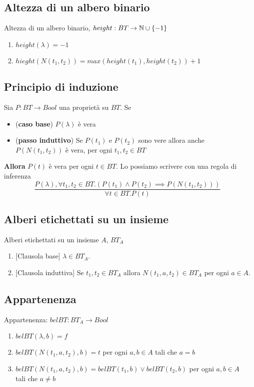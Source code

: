 \documentclass{article}
\begin{document}
\subsection*{Altezza di un albero binario}
Altezza di un albero binario, \(height: BT \rightarrow \mathbb{N} \cup \{-1\}\)
\begin{enumerate}
    \item \(height(\lambda) = -1\)
    \item \(hieght(N(t_1,t_2)) = max(height(t_1), height(t_2)) + 1\)
\end{enumerate}
\subsection*{Principio di induzione}
Sia \(P: BT \rightarrow Bool\) una proprietà su \(BT\). Se
\begin{itemize}
    \item (\textbf{caso base}) \(P(\lambda)\) è vera
    \item (\textbf{passo induttivo}) Se \(P(t_1)\) e \(P(t_2)\) sono vere allora anche \(P(N(t_1,t_2))\) è vera, per ogni \(t_1, t_2 \in BT\)
\end{itemize}
\textbf{Allora} \(P(t)\) è vera per ogni \(t \in BT\). Lo possiamo scrivere con una regola di inferenza
\[\frac{
        P(\lambda), \forall t_1, t_2 \in BT . (P(t_1) \land P(t_2) \implies P(N(t_1, t_2)))
    }{
        \forall t \in BT . P(t)
    }
\]

\subsection{Alberi etichettati su un insieme}
Alberi etichettati su un insieme \(A\), \(BT_A\)
\begin{enumerate}
    \item {[Clausola base]} \(\lambda \in BT_A\).
    \item {[Clausola induttiva]} Se \(t_1, t_2 \in BT_A\) allora \(N(t_1, a, t_2)\in BT_A\) per ogni \(a \in A\).
\end{enumerate}
\subsection*{Appartenenza}
Appartenenza: \(belBT: BT_A \rightarrow Bool\)
\begin{enumerate}
    \item \(belBT(\lambda, b) = f\)
    \item \(belBT(N(t_1, a, t_2), b) = t\) per ogni \(a,b \in A\) tali che \(a = b\)
    \item \(belBT(N(t_1, a, t_2), b) = belBT(t_1, b) \lor belBT(t_2, b)\) per ogni \(a,b \in A\) tali che \(a \neq b\)
\end{enumerate}
\end{document}

